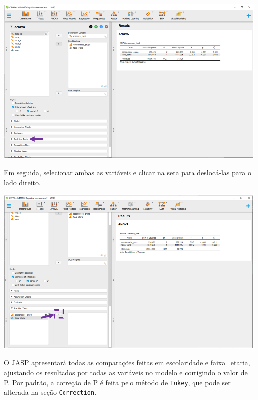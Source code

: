 \documentclass[
]{book}
\begin{document}
\includegraphics{./img/cap_anova_two_way_posthoc.png}

Em seguida, selecionar ambas as variáveis e clicar na seta para deslocá-las para o lado direito.

\includegraphics{./img/cap_anova_two_way_posthoc_interface.png}

O JASP apresentará todas as comparações feitas em escolaridade e faixa\_etaria, ajustando os resultados por todas as variáveis no modelo e corrigindo o valor de P. Por padrão, a correção de P é feita pelo método de \texttt{Tukey}, que pode ser alterada na seção \texttt{Correction}.
\end{document}
